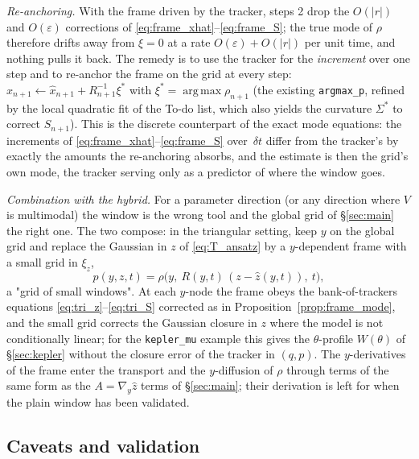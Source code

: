 \documentclass[11pt,a4paper]{article}
\newcommand{\argmax}{\operatorname{arg\,max}}
\newcommand{\xh}{\hat{x}}
\newcommand{\zh}{\hat{z}}
\newcommand{\eps}{\varepsilon}
\newcommand{\abs}[1]{\left\lvert #1 \right\rvert}
\newcommand{\gy}{\nabla_{\!y}}
\newcommand{\dt}{\,\delta t}
\theoremstyle{plain}
\theoremstyle{definition}
\theoremstyle{remark}
\begin{document}
\emph{Re-anchoring.} With the frame driven by the tracker, steps 2 drop the $O(\abs r)$ and $O(\eps)$ corrections of \eqref{eq:frame_xhat}--\eqref{eq:frame_S}; the true mode of $\rho$ therefore drifts away from $\xi=0$ at a rate $O(\eps)+O(\abs r)$ per unit time, and nothing pulls it back. The remedy is to use the tracker for the \emph{increment} over one step and to re-anchor the frame on the grid at every step: $\xh_{n+1} \leftarrow \xh_{n+1} + R_{n+1}^{-1}\xi^*$ with $\xi^* = \argmax\rho_{n+1}$ (the existing \texttt{argmax\_p}, refined by the local quadratic fit of the To-do list, which also yields the curvature $\Sigma^*$ to correct $S_{n+1}$). This is the discrete counterpart of the exact mode equations: the increments of \eqref{eq:frame_xhat}--\eqref{eq:frame_S} over $\dt$ differ from the tracker's by exactly the amounts the re-anchoring absorbs, and the estimate is then the grid's own mode, the tracker serving only as a predictor of where the window goes.

\emph{Combination with the hybrid.} For a parameter direction (or any direction where $V$ is multimodal) the window is the wrong tool and the global grid of \S\ref{sec:main} the right one. The two compose: in the triangular setting, keep $y$ on the global grid and replace the Gaussian in $z$ of \eqref{eq:T_ansatz} by a $y$-dependent frame with a small grid in $\xi_z$,
\[
  p(y,z,t) = \rho\big(y,\ R(y,t)\,(z-\zh(y,t)),\ t\big),
\]
a "grid of small windows". At each $y$-node the frame obeys the bank-of-trackers equations \eqref{eq:tri_z}--\eqref{eq:tri_S} corrected as in Proposition~\ref{prop:frame_mode}, and the small grid corrects the Gaussian closure in $z$ where the model is not conditionally linear; for the \texttt{kepler\_mu} example this gives the $\theta$-profile $W(\theta)$ of \S\ref{sec:kepler} without the closure error of the tracker in $(q,p)$. The $y$-derivatives of the frame enter the transport and the $y$-diffusion of $\rho$ through terms of the same form as the $A=\gy\zh$ terms of \S\ref{sec:main}; their derivation is left for when the plain window has been validated.

\subsection{Caveats and validation}
\end{document}
